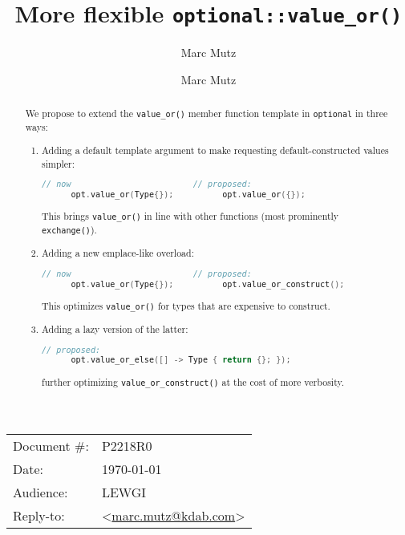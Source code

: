 \documentclass[11pt]{article}
\date{}
\title{More flexible \texttt{optional::value\_or()}}
\author{Marc Mutz}
\makeatletter
\newcommand{\emailaddress}{marc.mutz@kdab.com}
\newcommand{\email}{\href{mailto:\emailaddress}{\emailaddress}}
\makeatother
\begin{document}
\maketitle\vspace{-1cm}

\begin{tabular}{ll}
  Document \#:&P2218R0\\
  Date:       &\today\\
  Audience:   &LEWGI\\
  Reply-to:   &\author{Marc Mutz} \textless\email\textgreater
\end{tabular}
\begin{abstract}
  We propose to extend the \texttt{value\_or()} member function
  template in \texttt{optional} in three ways:
  \begin{enumerate}
  \item Adding a default template argument to make requesting
    default-constructed values simpler:
    \begin{lstlisting}[language=c++]
      // now                         // proposed:
      opt.value_or(Type{});          opt.value_or({});
    \end{lstlisting}
    This brings \texttt{value\_or()} in line with other functions
    (most prominently \texttt{exchange()}).
  \item Adding a new emplace-like overload:
    \begin{lstlisting}[language=c++]
      // now                         // proposed:
      opt.value_or(Type{});          opt.value_or_construct();
    \end{lstlisting}
    This optimizes \texttt{value\_or()} for types that are expensive
    to construct.
  \item Adding a lazy version of the latter:
    \begin{lstlisting}[language=c++]
      // proposed:
      opt.value_or_else([] -> Type { return {}; });
    \end{lstlisting}
    further optimizing \texttt{value\_or\_construct()} at the cost of
    more verbosity.
  \end{enumerate}
\end{abstract}

\tableofcontents

\end{document}
